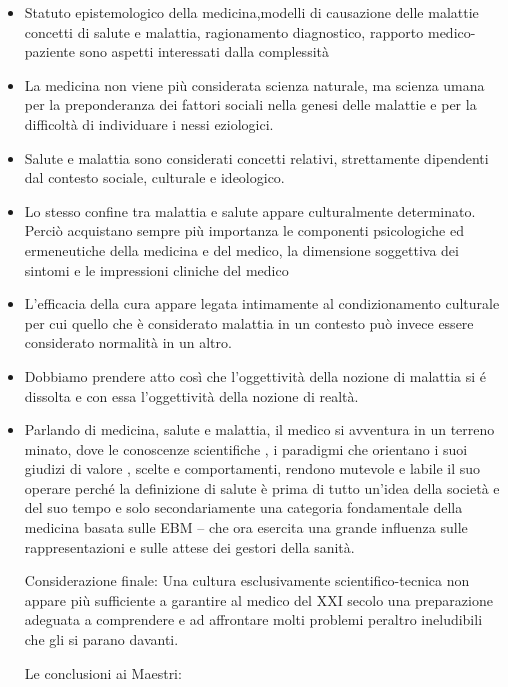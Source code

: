 \documentclass[]{article}
\begin{document}
\begin{itemize}
\item
  Statuto epistemologico della medicina,modelli di causazione delle
  malattie concetti di salute e malattia, ragionamento diagnostico,
  rapporto medico-paziente sono aspetti interessati dalla complessità
\item
  La medicina non viene più considerata scienza naturale, ma scienza
  umana per la preponderanza dei fattori sociali nella genesi delle
  malattie e per la difficoltà di individuare i nessi eziologici.
\item
  Salute e malattia sono considerati concetti relativi, strettamente
  dipendenti dal contesto sociale, culturale e ideologico.
\item
  Lo stesso confine tra malattia e salute appare culturalmente
  determinato. Perciò acquistano sempre più importanza le componenti
  psicologiche ed ermeneutiche della medicina e del medico, la
  dimensione soggettiva dei sintomi e le impressioni cliniche del medico
\item
  L'efficacia della cura appare legata intimamente al condizionamento
  culturale per cui quello che è considerato malattia in un contesto può
  invece essere considerato normalità in un altro.
\item
  Dobbiamo prendere atto così che l'oggettività della nozione di
  malattia si é dissolta e con essa l'oggettività della nozione di
  realtà.
\item
  Parlando di medicina, salute e malattia, il medico si avventura in un
  terreno minato, dove le conoscenze scientifiche , i paradigmi che
  orientano i suoi giudizi di valore , scelte e comportamenti, rendono
  mutevole e labile il suo operare perché la definizione di salute è
  prima di tutto un'idea della società e del suo tempo e solo
  secondariamente una categoria fondamentale della medicina basata sulle
  EBM -- che ora esercita una grande influenza sulle rappresentazioni e
  sulle attese dei gestori della sanità.

  Considerazione finale: Una cultura esclusivamente scientifico-tecnica
  non appare più sufficiente a garantire al medico del XXI secolo una
  preparazione adeguata a comprendere e ad affrontare molti problemi
  peraltro ineludibili che gli si parano davanti.

  Le conclusioni ai Maestri:
\end{itemize}
\end{document}
